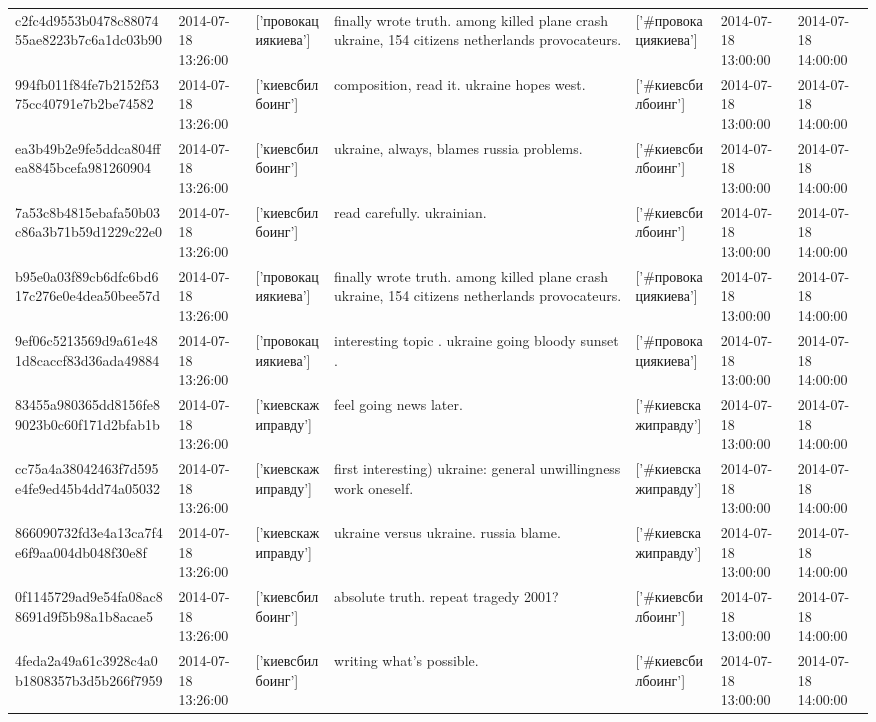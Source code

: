\begin{tabular}{lllllll}
c2fc4d9553b0478c8807455ae8223b7c6a1dc03b90 & 2014-07-18 13:26:00 & ['провокациякиева'] & finally wrote truth. among killed plane crash ukraine, 154 citizens netherlands provocateurs. & ['#провокациякиева'] & 2014-07-18 13:00:00 & 2014-07-18 14:00:00 \\
994fb011f84fe7b2152f5375cc40791e7b2be74582 & 2014-07-18 13:26:00 & ['киевсбилбоинг'] & composition, read it. ukraine hopes west. & ['#киевсбилбоинг'] & 2014-07-18 13:00:00 & 2014-07-18 14:00:00 \\
ea3b49b2e9fe5ddca804ffea8845bcefa981260904 & 2014-07-18 13:26:00 & ['киевсбилбоинг'] & ukraine, always, blames russia problems. & ['#киевсбилбоинг'] & 2014-07-18 13:00:00 & 2014-07-18 14:00:00 \\
7a53c8b4815ebafa50b03c86a3b71b59d1229c22e0 & 2014-07-18 13:26:00 & ['киевсбилбоинг'] & read carefully. ukrainian. & ['#киевсбилбоинг'] & 2014-07-18 13:00:00 & 2014-07-18 14:00:00 \\
b95e0a03f89cb6dfc6bd617c276e0e4dea50bee57d & 2014-07-18 13:26:00 & ['провокациякиева'] & finally wrote truth. among killed plane crash ukraine, 154 citizens netherlands provocateurs. & ['#провокациякиева'] & 2014-07-18 13:00:00 & 2014-07-18 14:00:00 \\
9ef06c5213569d9a61e481d8caccf83d36ada49884 & 2014-07-18 13:26:00 & ['провокациякиева'] & interesting topic . ukraine going bloody sunset . & ['#провокациякиева'] & 2014-07-18 13:00:00 & 2014-07-18 14:00:00 \\
83455a980365dd8156fe89023b0c60f171d2bfab1b & 2014-07-18 13:26:00 & ['киевскажиправду'] & feel going news later. & ['#киевскажиправду'] & 2014-07-18 13:00:00 & 2014-07-18 14:00:00 \\
cc75a4a38042463f7d595e4fe9ed45b4dd74a05032 & 2014-07-18 13:26:00 & ['киевскажиправду'] & first interesting) ukraine: general unwillingness work oneself. & ['#киевскажиправду'] & 2014-07-18 13:00:00 & 2014-07-18 14:00:00 \\
866090732fd3e4a13ca7f4e6f9aa004db048f30e8f & 2014-07-18 13:26:00 & ['киевскажиправду'] & ukraine versus ukraine. russia blame. & ['#киевскажиправду'] & 2014-07-18 13:00:00 & 2014-07-18 14:00:00 \\
0f1145729ad9e54fa08ac88691d9f5b98a1b8acae5 & 2014-07-18 13:26:00 & ['киевсбилбоинг'] & absolute truth. repeat tragedy 2001? & ['#киевсбилбоинг'] & 2014-07-18 13:00:00 & 2014-07-18 14:00:00 \\
4feda2a49a61c3928c4a0b1808357b3d5b266f7959 & 2014-07-18 13:26:00 & ['киевсбилбоинг'] & writing what's possible. & ['#киевсбилбоинг'] & 2014-07-18 13:00:00 & 2014-07-18 14:00:00 \\

\end{tabular}
